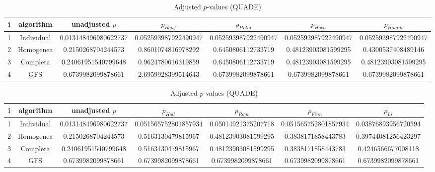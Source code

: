 \documentclass[a4paper,10pt]{article}
\begin{document}
\begin{landscape}
\newpage

\begin{table}[!htp]
\centering\scriptsize
\caption{Adjusted $p$-values (QUADE)}
\begin{tabular}{ccccccc}
i&algorithm&unadjusted $p$&$p_{Bonf}$&$p_{Holm}$&$p_{Hoch}$&$p_{Homm}$\\
\hline
1&Individual&0.013148496980622737&0.052593987922490947&0.052593987922490947&0.052593987922490947&0.052593987922490947\\
2&Homogenea&0.2150268704244573&0.8601074816978292&0.6450806112733719&0.48123903081599295&0.4300537408489146\\
3&Completa&0.24061951540799648&0.9624780616319859&0.6450806112733719&0.48123903081599295&0.48123903081599295\\
4&GFS&0.6739982099878661&2.6959928399514643&0.6739982099878661&0.6739982099878661&0.6739982099878661\\
\hline
\end{tabular}
\end{table}

\begin{table}[!htp]
\centering\scriptsize
\caption{Adjusted $p$-values (QUADE)}
\begin{tabular}{ccccccc}
i&algorithm&unadjusted $p$&$p_{Holl}$&$p_{Rom}$&$p_{Finn}$&$p_{Li}$\\
\hline
1&Individual&0.013148496980622737&0.051565752801857934&0.05014921375207718&0.051565752801857934&0.03876893956720594\\
2&Homogenea&0.2150268704244573&0.5163130479815967&0.48123903081599295&0.3838171858443783&0.39744081256423297\\
3&Completa&0.24061951540799648&0.5163130479815967&0.48123903081599295&0.3838171858443783&0.4246566677008118\\
4&GFS&0.6739982099878661&0.6739982099878661&0.6739982099878661&0.6739982099878661&0.6739982099878661\\
\hline
\end{tabular}
\end{table}

\end{landscape}
\end{document}
